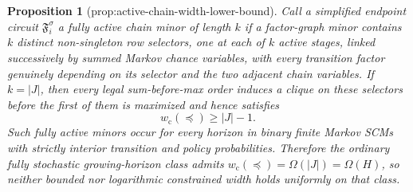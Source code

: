 \documentclass{article}
\newtheorem{proposition}{Proposition}
\begin{document}
\begin{proposition}[prop:active-chain-width-lower-bound]\label{prop:active-chain-width-lower-bound}
Call a simplified endpoint circuit \(\mathfrak F_i^\sigma\) a fully active chain minor of length \(k\) if a factor-graph minor contains \(k\) distinct non-singleton row selectors, one at each of \(k\) active stages, linked successively by summed Markov chance variables, with every transition factor genuinely depending on its selector and the two adjacent chain variables.  If \(k=|J|\), then every legal sum-before-max order induces a clique on these selectors before the first of them is maximized and hence satisfies
\[
 w_{\mathrm c}(\preceq)\ge |J|-1.
\]
Such fully active minors occur for every horizon in binary finite Markov SCMs with strictly interior transition and policy probabilities.  Therefore the ordinary fully stochastic growing-horizon class admits \(w_{\mathrm c}(\preceq)=\Omega(|J|)=\Omega(H)\), so neither bounded nor logarithmic constrained width holds uniformly on that class.
\end{proposition}
\end{document}
